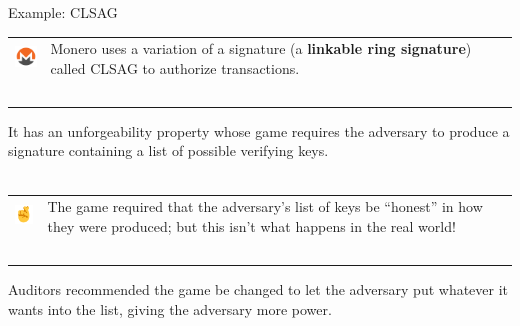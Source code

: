 \documentclass[aspectratio=169]{beamer}
\begin{document}
\begin{frame}{Example: CLSAG}
    \begin{tabular}{>{\arraybackslash}m{40px} >{\arraybackslash}m{320px}}
        \includegraphics[width=30px]{images/monero.png} & Monero uses a variation of a signature (a \textbf{linkable ring signature}) called CLSAG to authorize transactions. \\~\\
    \end{tabular}

    It has an unforgeability property whose game requires the adversary to produce a signature containing a list of possible verifying keys. \\~\\

    \begin{tabular}{>{\arraybackslash}m{40px} >{\arraybackslash}m{320px}}
        \includegraphics[width=30px]{images/fingers.png} & The game required that the adversary's list of keys be ``honest'' in how they were produced; but this isn't what happens in the real world! \\~\\
    \end{tabular}

    Auditors recommended the game be changed to let the adversary put whatever it wants into the list, giving the adversary more power.
\end{frame}
\end{document}
